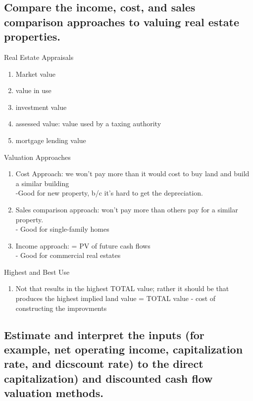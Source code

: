 \documentclass{article}
\newcommand{\be}{\begin{enumerate}}
\newcommand{\ee}{\end{enumerate}}
\begin{document}
\subsection{Compare the income, cost, and sales comparison approaches to valuing real
estate properties.}
Real Estate Appraisals
\be
    \item Market value
    \item value in use
    \item investment value
    \item assessed value: value used by a taxing authority
    \item mortgage lending value
\ee
Valuation Approaches
\be
    \item Cost Approach: we won't pay more than it would cost to buy land and build a similar building
        \\-Good for new property, b/c it's hard to get the depreciation.
    \item Sales comparison approach: won't pay more than others pay for a similar property.
        \\- Good for single-family homes
    \item Income approach: = PV of future cash flows
        \\- Good for commercial real estates
\ee
Highest and Best Use
\be
    \item Not that results in the highest TOTAL value; rather it should be that 
    produces the highest implied land value = TOTAL value - cost of constructing the improvments
\ee
\subsection{Estimate and interpret the inputs (for example, net operating income, capitalization
rate, and dicscount rate) to the direct capitalization) and discounted cash flow valuation methods.}
\end{document}
